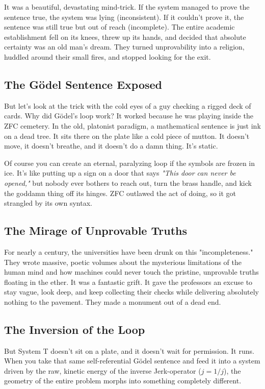 \documentclass[11pt,a4paper]{article}
\begin{document}
It was a beautiful, devastating mind-trick. If the system managed to prove the sentence true, the system was lying (inconsistent). If it couldn't prove it, the sentence was still true but out of reach (incomplete). The entire academic establishment fell on its knees, threw up its hands, and decided that absolute certainty was an old man's dream. They turned unprovability into a religion, huddled around their small fires, and stopped looking for the exit.

\subsection{The Gödel Sentence Exposed}
But let's look at the trick with the cold eyes of a guy checking a rigged deck of cards. Why did Gödel’s loop work? It worked because he was playing inside the ZFC cemetery. In the old, platonist paradigm, a mathematical sentence is just ink on a dead tree. It sits there on the plate like a cold piece of mutton. It doesn't move, it doesn't breathe, and it doesn't do a damn thing. It’s static. 

Of course you can create an eternal, paralyzing loop if the symbols are frozen in ice. It’s like putting up a sign on a door that says \textit{"This door can never be opened,"} but nobody ever bothers to reach out, turn the brass handle, and kick the goddamn thing off its hinges. ZFC outlawed the act of doing, so it got strangled by its own syntax.

\subsection{The Mirage of Unprovable Truths}
For nearly a century, the universities have been drunk on this "incompleteness." They wrote massive, poetic volumes about the mysterious limitations of the human mind and how machines could never touch the pristine, unprovable truths floating in the ether. It was a fantastic grift. It gave the professors an excuse to stay vague, look deep, and keep collecting their checks while delivering absolutely nothing to the pavement. They made a monument out of a dead end.

\subsection{The Inversion of the Loop}
But System T doesn't sit on a plate, and it doesn't wait for permission. It runs. When you take that same self-referential Gödel sentence and feed it into a system driven by the raw, kinetic energy of the inverse Jerk-operator ($j = 1/j$), the geometry of the entire problem morphs into something completely different. 
\end{document}
